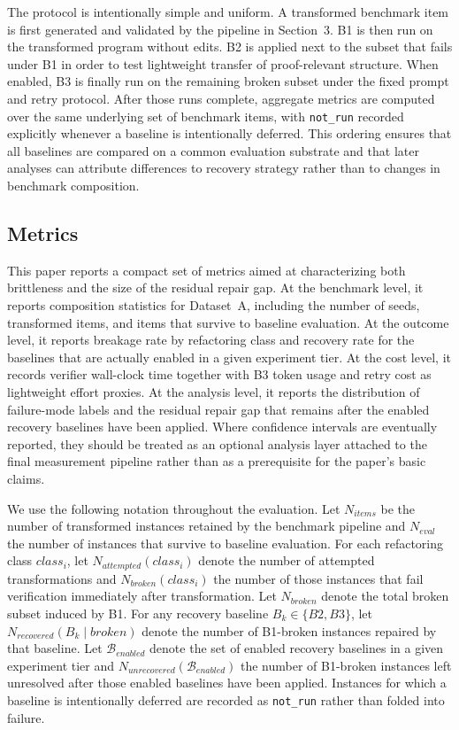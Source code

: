 The protocol is intentionally simple and uniform. A transformed benchmark item is first generated and validated by the pipeline in Section~3. B1 is then run on the transformed program without edits. B2 is applied next to the subset that fails under B1 in order to test lightweight transfer of proof-relevant structure. When enabled, B3 is finally run on the remaining broken subset under the fixed prompt and retry protocol. After those runs complete, aggregate metrics are computed over the same underlying set of benchmark items, with \texttt{not\_run} recorded explicitly whenever a baseline is intentionally deferred. This ordering ensures that all baselines are compared on a common evaluation substrate and that later analyses can attribute differences to recovery strategy rather than to changes in benchmark composition.

\subsection{Metrics}

This paper reports a compact set of metrics aimed at characterizing both brittleness and the size of the residual repair gap. At the benchmark level, it reports composition statistics for Dataset~A, including the number of seeds, transformed items, and items that survive to baseline evaluation. At the outcome level, it reports breakage rate by refactoring class and recovery rate for the baselines that are actually enabled in a given experiment tier. At the cost level, it records verifier wall-clock time together with B3 token usage and retry cost as lightweight effort proxies. At the analysis level, it reports the distribution of failure-mode labels and the residual repair gap that remains after the enabled recovery baselines have been applied. Where confidence intervals are eventually reported, they should be treated as an optional analysis layer attached to the final measurement pipeline rather than as a prerequisite for the paper's basic claims.

We use the following notation throughout the evaluation. Let $N_{\mathit{items}}$ be the number of transformed instances retained by the benchmark pipeline and $N_{\mathit{eval}}$ the number of instances that survive to baseline evaluation. For each refactoring class $class_i$, let $N_{\mathit{attempted}}(class_i)$ denote the number of attempted transformations and $N_{\mathit{broken}}(class_i)$ the number of those instances that fail verification immediately after transformation. Let $N_{\mathit{broken}}$ denote the total broken subset induced by B1. For any recovery baseline $B_k \in \{B2, B3\}$, let $N_{\mathit{recovered}}(B_k \mid \mathit{broken})$ denote the number of B1-broken instances repaired by that baseline. Let $\mathcal{B}_{\mathit{enabled}}$ denote the set of enabled recovery baselines in a given experiment tier and $N_{\mathit{unrecovered}}(\mathcal{B}_{\mathit{enabled}})$ the number of B1-broken instances left unresolved after those enabled baselines have been applied. Instances for which a baseline is intentionally deferred are recorded as \texttt{not\_run} rather than folded into failure.

